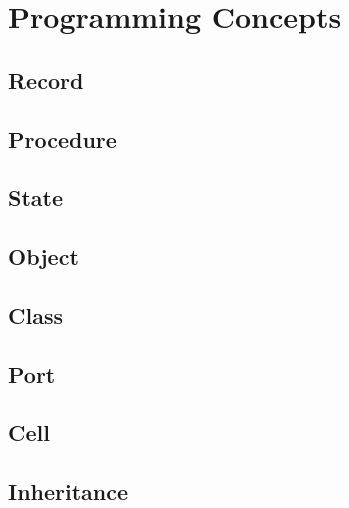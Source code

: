\section{Programming Concepts}


\subsection{Record}


\subsection{Procedure}


\subsection{State}


\subsection{Object}


\subsection{Class}


\subsection{Port}


\subsection{Cell}


\subsection{Inheritance}

